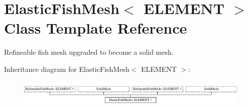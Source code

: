 \hypertarget{classElasticFishMesh}{}\section{Elastic\+Fish\+Mesh$<$ E\+L\+E\+M\+E\+NT $>$ Class Template Reference}
\label{classElasticFishMesh}


Refineable fish mesh upgraded to become a solid mesh.  


Inheritance diagram for Elastic\+Fish\+Mesh$<$ E\+L\+E\+M\+E\+NT $>$\+:\begin{figure}[H]
\begin{center}
\leavevmode
\includegraphics[height=1.290323cm]{classElasticFishMesh}
\end{center}
\end{figure}
